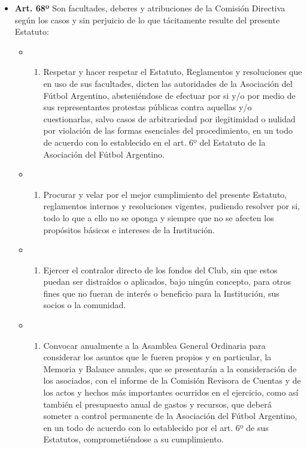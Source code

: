 \documentclass[]{book}
\providecommand{\tightlist}{%
  \setlength{\itemsep}{0pt}\setlength{\parskip}{0pt}}
\begin{document}
\begin{itemize}
\tightlist
\item
  \textbf{Art. 68º}
  Son facultades, deberes y atribuciones de la Comisión Directiva según los casos y sin perjuicio de lo que tácitamente resulte del presente Estatuto:

  \begin{itemize}
  \item
    \begin{enumerate}
    \def\labelenumi{\alph{enumi})}
    \tightlist
    \item
      Respetar y hacer respetar el Estatuto, Reglamentos y resoluciones que en uso de sus facultades, dicten las autoridades de la Asociación del Fútbol Argentino, absteniéndose de efectuar por si y/o por medio de sus representantes protestas públicas contra aquellas y/o cuestionarlas, salvo casos de arbitrariedad por ilegitimidad o nulidad por violación de las formas esenciales del procedimiento, en un todo de acuerdo con lo establecido en el art. 6º del Estatuto de la Asociación del Fútbol Argentino.
    \end{enumerate}
  \item
    \begin{enumerate}
    \def\labelenumi{\alph{enumi})}
    \setcounter{enumi}{1}
    \tightlist
    \item
      Procurar y velar por el mejor cumplimiento del presente Estatuto, reglamentos internos y resoluciones vigentes, pudiendo resolver por si, todo lo que a ello no se oponga y siempre que no se afecten los propósitos básicos e intereses de la Institución.
    \end{enumerate}
  \item
    \begin{enumerate}
    \def\labelenumi{\alph{enumi})}
    \setcounter{enumi}{2}
    \tightlist
    \item
      Ejercer el contralor directo de los fondos del Club, sin que estos puedan ser distraídos o aplicados, bajo ningún concepto, para otros fines que no fueran de interés o beneficio para la Institución, sus socios o la comunidad.
    \end{enumerate}
  \item
    \begin{enumerate}
    \def\labelenumi{\alph{enumi})}
    \setcounter{enumi}{3}
    \tightlist
    \item
      Convocar anualmente a la Asamblea General Ordinaria para considerar los asuntos que le fueren propios y en particular, la Memoria y Balance anuales, que se presentarán a la consideración de los asociados, con el informe de la Comisión Revisora de Cuentas y de los actos y hechos más importantes ocurridos en el ejercicio, como así también el presupuesto anual de gastos y recursos, que deberá someter a control permanente de la Asociación del Fútbol Argentino, en un todo de acuerdo con lo establecido por el art. 6º de sus Estatutos, comprometiéndose a su cumplimiento.

\end{enumerate}
\end{itemize}
\end{itemize}
\end{document}
